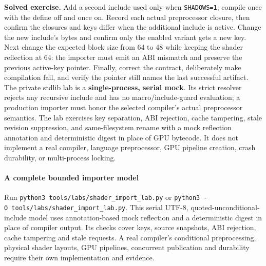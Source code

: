 \textbf{Solved exercise.} Add a second include used only when \texttt{SHADOWS=1}; compile once with the define off and once on. Record each actual preprocessor closure, then confirm the closures and keys differ when the additional include is active. Change the new include's bytes and confirm only the enabled variant gets a new key. Next change the expected block size from 64 to 48 while keeping the shader reflection at 64: the importer must emit an ABI mismatch and preserve the previous active-key pointer. Finally, correct the contract, deliberately make compilation fail, and verify the pointer still names the last successful artifact. The private stdlib lab is a \textbf{single-process, serial mock}. Its strict resolver rejects any recursive include and has no macro/include-guard evaluation; a production importer must honor the selected compiler's actual preprocessor semantics. The lab exercises key separation, ABI rejection, cache tampering, stale revision suppression, and same-filesystem rename with a mock reflection annotation and deterministic digest in place of GPU bytecode. It does not implement a real compiler, language preprocessor, GPU pipeline creation, crash durability, or multi-process locking.

\paragraph{A complete bounded importer model}\label{a-complete-bounded-importer-model}

Run \texttt{python3\ tools/labs/shader\_import\_lab.py} or \texttt{python3\ -O\ tools/labs/shader\_import\_lab.py}. This serial UTF-8, quoted-unconditional-include model uses annotation-based mock reflection and a deterministic digest in place of compiler output. Its checks cover keys, source snapshots, ABI rejection, cache tampering and stale requests. A real compiler's conditional preprocessing, physical shader layouts, GPU pipelines, concurrent publication and durability require their own implementation and evidence.


